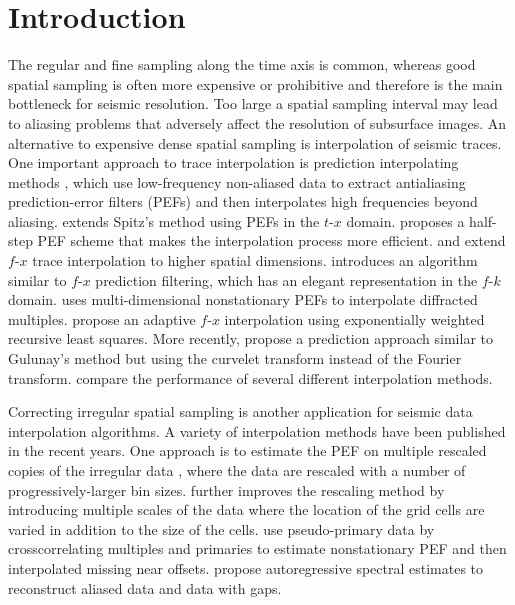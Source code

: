 \section{Introduction}
The regular and fine sampling along the time
axis is common, whereas good spatial sampling is often more expensive
or prohibitive and therefore is the main bottleneck for seismic
resolution. Too large a spatial sampling interval may lead to
aliasing problems that adversely affect the resolution
of subsurface images. An alternative to expensive dense spatial
sampling is interpolation of seismic traces. One important approach to
trace interpolation is prediction interpolating methods
\cite[]{GEO56-06-07850794}, which use low-frequency non-aliased data
to extract antialiasing prediction-error filters (PEFs) and then
interpolates high frequencies beyond aliasing. \cite{Claerbout92}
extends Spitz's method using PEFs in the $t$-$x$
domain. \cite{GEO64-05-14611467} proposes a half-step PEF scheme that
makes the interpolation process more efficient. \cite{Huard96}
and \cite{GEO67-04-12321239} extend $f$-$x$ trace interpolation to higher
spatial dimensions. \cite{GEO68-01-03550369} introduces an algorithm
similar to $f$-$x$ prediction filtering, which has an elegant
representation in the $f$-$k$ domain. \cite{Curry06} uses
multi-dimensional nonstationary PEFs to interpolate diffracted
multiples. \cite{Naghizadeh09} propose an adaptive $f$-$x$
interpolation using exponentially weighted recursive least
squares. More recently, \cite{Naghizadeh10a} propose a prediction
approach similar to Gulunay's method but using the curvelet transform
instead of the Fourier transform. \cite{Abma05} compare the
performance of several different interpolation methods.

Correcting irregular spatial sampling is another application for
seismic data interpolation algorithms. A variety of interpolation
methods have been published in the recent years. One approach is to
estimate the PEF on multiple rescaled copies of the irregular
data \cite[]{Curry03}, where the data are rescaled with a number of
progressively-larger bin sizes. \cite{Curry04} further improves the
rescaling method by introducing multiple scales of the data where the
location of the grid cells are varied in addition to the size of the
cells. \cite{Curry08} use pseudo-primary data by crosscorrelating
multiples and primaries to estimate nonstationary PEF and then
interpolated missing near offsets. \cite{Naghizadeh10b} propose
autoregressive spectral estimates to reconstruct aliased data and data
with gaps.

